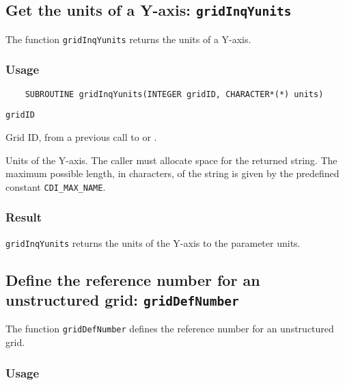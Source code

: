 \subsection{Get the units of a Y-axis: {\tt gridInqYunits}}
\label{gridInqYunits}

The function {\tt gridInqYunits} returns the units of a Y-axis.

\subsubsection*{Usage}

\begin{verbatim}
    SUBROUTINE gridInqYunits(INTEGER gridID, CHARACTER*(*) units)
\end{verbatim}

\hspace*{4mm}\begin{minipage}[]{15cm}
\begin{deflist}{\tt gridID\ }
\item[{\tt gridID}]
Grid ID, from a previous call to {} or {}.
\item[{\tt units}]
Units of the Y-axis. The caller must allocate space for the
                    returned string. The maximum possible length, in characters, of
                    the string is given by the predefined constant {\tt CDI\_MAX\_NAME}.

\end{deflist}
\end{minipage}

\subsubsection*{Result}

{\tt gridInqYunits} returns the units of the Y-axis to the parameter units.



\subsection{Define the reference number for an unstructured grid: {\tt gridDefNumber}}
\label{gridDefNumber}

The function {\tt gridDefNumber} defines the reference number for an unstructured grid.

\subsubsection*{Usage}

